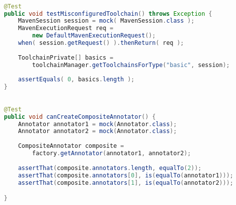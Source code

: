 \begin{lstlisting}[basicstyle=\ttfamily, caption={This code snippet illustrates an example from maven-core, where both the focal method and a method invocation on a mocked object occur in test \textit{testMisconfiguredToolchain()}},
basicstyle=\scriptsize\ttfamily,language = Java, framesep=4.5mm,
framexleftmargin=1.0mm, captionpos=b, xleftmargin=3.5ex, label=lis:mockCall]

@Test
public void testMisconfiguredToolchain() throws Exception {
	MavenSession session = mock( MavenSession.class );
	MavenExecutionRequest req = 
		new DefaultMavenExecutionRequest();
	when( session.getRequest() ).thenReturn( req );
	
	ToolchainPrivate[] basics =
	 	toolchainManager.getToolchainsForType("basic", session);
	
	assertEquals( 0, basics.length );
}

\end{lstlisting}

\begin{lstlisting}[basicstyle=\ttfamily, caption={This example illustrates an array container holding mock objects from test case \textit{canCreateCompositeAnnotator()}.},
basicstyle=\scriptsize\ttfamily,language = Java, framesep=4.5mm,
framexleftmargin=1mm, captionpos=b, xleftmargin=3.5ex, label=lis:container]

@Test
public void canCreateCompositeAnnotator() {
	Annotator annotator1 = mock(Annotator.class);
	Annotator annotator2 = mock(Annotator.class);
	
	CompositeAnnotator composite = 
		factory.getAnnotator(annotator1, annotator2);
	
	assertThat(composite.annotators.length, equalTo(2));
	assertThat(composite.annotators[0], is(equalTo(annotator1)));
	assertThat(composite.annotators[1], is(equalTo(annotator2)));

}

\end{lstlisting}
